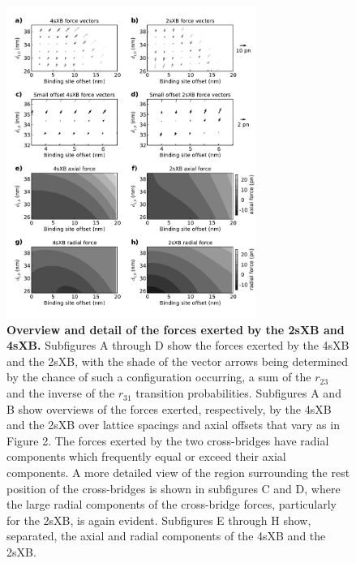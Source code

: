 \documentclass[]{article}
\begin{document}
\begin{figure}[htbp]
    \begin{center}
    \includegraphics[width=3.2in]{../imgs/Figure4.pdf}
    \caption{
        \label{fig_forces}
        \textbf{Overview and detail of the forces exerted by the 2sXB and 4sXB.}
        Subfigures A through D show the forces exerted by the 4sXB and the 2sXB, with the shade of the vector arrows being determined by the chance of such a configuration occurring, a sum of the $r_{23}$ and the inverse of the $r_{31}$ transition probabilities. 
        Subfigures A and B show overviews of the forces exerted, respectively, by the 4sXB and the 2sXB over lattice spacings and axial offsets that vary as in Figure 2.
        The forces exerted by the two cross-bridges have radial components which frequently equal or exceed their axial components.
        A more detailed view of the region surrounding the rest position of the cross-bridges is shown in subfigures C and D, where the large radial components of the cross-bridge forces, particularly for the 2sXB, is again evident.
        Subfigures E through H show, separated, the axial and radial components of the 4sXB and the 2sXB.
    }
    \end{center}
\end{figure}

\clearpage


\end{document}
